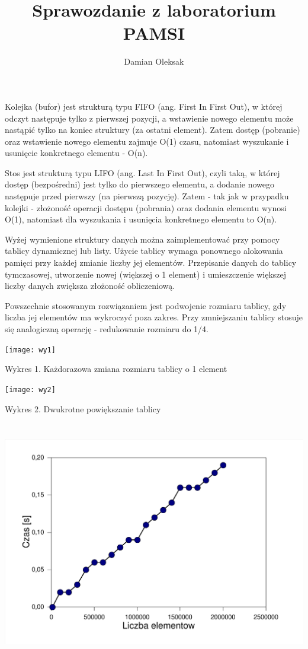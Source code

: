 \documentclass[12pt,a4paper]{article}
\title{Sprawozdanie z laboratorium PAMSI}
\author{Damian Oleksak}
\date{}
\begin{document}
\maketitle

Kolejka (bufor) jest strukturą typu FIFO (ang. First In First Out), w której odczyt następuje tylko 
z pierwszej pozycji, a wstawienie nowego elementu może nastąpić tylko na koniec struktury 
(za ostatni element). Zatem dostęp (pobranie) oraz wstawienie nowego elementu zajmuje O(1)
czasu, natomiast wyszukanie i usunięcie konkretnego elementu - O(n).

Stos jest strukturą typu LIFO (ang. Last In First Out), czyli taką, w której dostęp (bezpośredni)
jest tylko do pierwszego elementu, a dodanie nowego następuje przed pierwszy (na pierwszą pozycję). Zatem - tak jak w przypadku kolejki - złożoność operacji dostępu (pobrania) oraz dodania elementu wynosi O(1), natomiast dla wyszukania i usunięcia konkretnego elementu 
to O(n).

Wyżej wymienione struktury danych można zaimplementować przy pomocy tablicy dynamicznej lub listy. Użycie tablicy wymaga ponownego alokowania pamięci przy każdej zmianie liczby jej elementów. Przepisanie danych do tablicy tymczasowej, utworzenie nowej (większej o 1 element) i umieszczenie większej liczby danych zwiększa złożoność obliczeniową. 

Powszechnie stosowanym rozwiązaniem jest podwojenie rozmiaru tablicy, gdy liczba jej elementów ma wykroczyć poza zakres. Przy zmniejszaniu tablicy stosuje się analogiczną
operację - redukowanie rozmiaru do 1/4.

\texttt{[image: wy1]}

Wykres 1. Każdorazowa zmiana rozmiaru tablicy o 1 element \newline

\texttt{[image: wy2]}

Wykres 2. Dwukrotne powiększanie tablicy \newline

\includegraphics[width = 400pt, height = 300pt]{wy}
\end{document}
